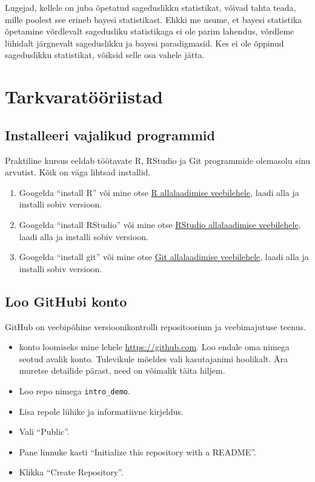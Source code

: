 \documentclass[]{book}
\providecommand{\tightlist}{%
  \setlength{\itemsep}{0pt}\setlength{\parskip}{0pt}}
\begin{document}
Lugejad, kellele on juba õpetatud sageduslikku statistikat, võivad tahta
teada, mille poolest see erineb bayesi statistikast. Ehkki me usume, et
bayesi statistika õpetamine võrdlevalt sagedusliku statistikaga ei ole
parim lahendus, võrdleme lühidalt järgnevalt sageduslikku ja bayesi
paradigmasid. Kes ei ole õppinud sageduslikku statistikat, võiksid selle
osa vahele jätta.

\chapter{Tarkvaratööriistad}\label{tools}

\section{Installeeri vajalikud
programmid}\label{installeeri-vajalikud-programmid}

Praktiline kursus eeldab töötavate R, RStudio ja Git programmide
olemasolu sinu arvutist. Kõik on väga lihtsad installid.

\begin{enumerate}
\def\labelenumi{\arabic{enumi}.}
\tightlist
\item
  Googelda ``install R'' või mine otse
  \href{https://cran.r-project.org}{R allalaadimise veebilehele}, laadi
  alla ja installi sobiv versioon.
\item
  Googelda ``install RStudio'' või mine otse
  \href{https://www.rstudio.com/products/rstudio/download/}{RStudio
  allalaadimise veebilehele}, laadi alla ja installi sobiv versioon.
\item
  Googelda ``install git'' või mine otse
  \href{https://git-scm.com/downloads}{Git allalaadimise veebilehele},
  laadi alla ja installi sobiv versioon.
\end{enumerate}

\section{Loo GitHubi konto}\label{loo-githubi-konto}

GitHub on veebipõhine versioonikontrolli repositoorium ja veebimajutuse
teenus.

\begin{itemize}
\item
   konto loomiseks mine lehele \url{https://github.com}. Loo endale oma
  nimega seotud avalik konto. Tulevikule mõeldes vali kasutajanimi
  hoolikalt. Ära muretse detailide pärast, need on võimalik täita
  hiljem.
\item
  Loo repo nimega \texttt{intro\_demo}.
\item
  Lisa repole lühike ja informatiivne kirjeldus.
\item
  Vali ``Public''.
\item
  Pane linnuke kasti ``Initialize this repository with a README''.
\item
  Klikka ``Create Repository''.
\end{itemize}
\end{document}
